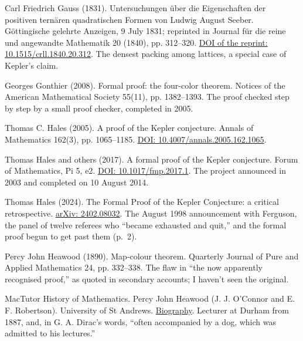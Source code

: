 \documentclass[11pt,twoside]{article}
\theoremstyle{thielethm}
\theoremstyle{thieledef}
\theoremstyle{thieledef}
\theoremstyle{thieledef}
\theoremstyle{thielethm}
\theoremstyle{thieleobs}
\theoremstyle{thielethm}
\begin{document}
\noindent Carl Friedrich Gauss (1831). Untersuchungen \"uber die Eigenschaften der positiven tern\"aren quadratischen Formen von Ludwig August Seeber. G\"ottingische gelehrte Anzeigen, 9 July 1831; reprinted in Journal f\"ur die reine und angewandte Mathematik 20 (1840), pp. 312--320. \href{https://doi.org/10.1515/crll.1840.20.312}{DOI of the reprint: 10.1515/crll.1840.20.312}. The densest packing among lattices, a special case of Kepler's claim.
\par\medskip

\noindent Georges Gonthier (2008). Formal proof: the four-color theorem. Notices of the American Mathematical Society 55(11), pp. 1382--1393. The proof checked step by step by a small proof checker, completed in 2005.
\par\medskip

\noindent Thomas C. Hales (2005). A proof of the Kepler conjecture. Annals of Mathematics 162(3), pp. 1065--1185. \href{https://doi.org/10.4007/annals.2005.162.1065}{DOI: 10.4007/annals.2005.162.1065}.
\par\medskip

\noindent Thomas Hales and others (2017). A formal proof of the Kepler conjecture. Forum of Mathematics, Pi 5, e2. \href{https://doi.org/10.1017/fmp.2017.1}{DOI: 10.1017/fmp.2017.1}. The project announced in 2003 and completed on 10 August 2014.
\par\medskip

\noindent Thomas Hales (2024). The Formal Proof of the Kepler Conjecture: a critical retrospective. \href{https://arxiv.org/abs/2402.08032}{arXiv: 2402.08032}. The August 1998 announcement with Ferguson, the panel of twelve referees who ``became exhausted and quit,'' and the formal proof begun to get past them (p.~2).
\par\medskip

\noindent Percy John Heawood (1890). Map-colour theorem. Quarterly Journal of Pure and Applied Mathematics 24, pp. 332--338. The flaw in ``the now apparently recognised proof,'' as quoted in secondary accounts; I haven't seen the original.
\par\medskip

\noindent MacTutor History of Mathematics. Percy John Heawood (J. J. O'Connor and E. F. Robertson). University of St Andrews. \href{https://mathshistory.st-andrews.ac.uk/Biographies/Heawood/}{Biography}. Lecturer at Durham from 1887, and, in G. A. Dirac's words, ``often accompanied by a dog, which was admitted to his lectures.''
\par\medskip
\end{document}
